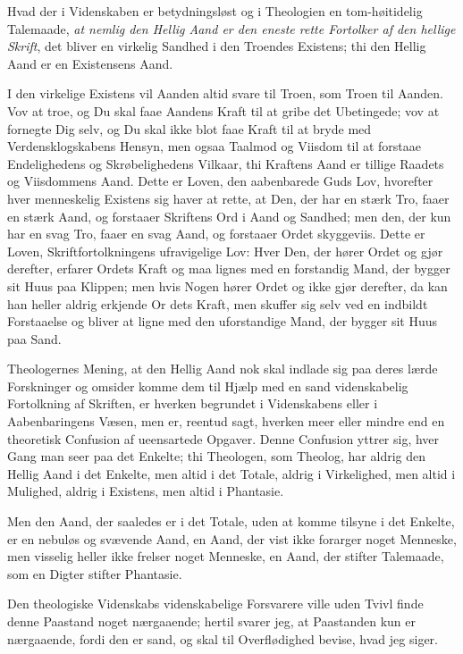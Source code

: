 \documentclass[12pt,a4paper]{book}
\newcommand{\opage}[1]{\marginnote{\footnotesize\textit{[#1]}}}
\begin{document}
Hvad der i Videnskaben er betydningsløst og i Theologien en tom-høitidelig
Talemaade, \emph{at nemlig den Hellig Aand er den eneste rette Fortolker af
den hellige Skrift}, det bliver en virkelig Sandhed i den Troendes Existens;
thi den Hellig Aand er en Existensens Aand.

I den virkelige Existens vil Aanden altid svare til Troen, som Troen til
Aanden. Vov at troe, og Du skal faae Aandens Kraft til at gribe det
Ubetingede; vov at fornegte Dig selv, og Du skal ikke blot faae Kraft til at
bryde med Verdensklogskabens Hensyn, men ogsaa Taalmod og Viisdom til at
forstaae Endelighedens og Skrøbelighedens Vilkaar, thi Kraftens Aand er
tillige Raadets og Viisdommens Aand. Dette er Loven, den aabenbarede Guds
Lov, hvorefter hver menneskelig Existens sig haver at rette, at Den, der har
en stærk Tro, faaer en stærk Aand, og forstaaer Skriftens Ord i Aand og
Sandhed; men den, der kun har en svag Tro, faaer en svag Aand, og forstaaer
Ordet skyggeviis. Dette er Loven, Skriftfortolkningens ufravigelige Lov: Hver
Den, der hører Ordet og gjør derefter, erfarer Ordets Kraft og maa lignes med
en forstandig Mand, der bygger sit Huus paa Klippen; men hvis Nogen hører
Ordet og ikke gjør derefter, da kan han heller aldrig erkjende Or\-%
\opage{78}dets Kraft, men skuffer sig selv ved en indbildt Forstaaelse og bliver at
ligne med den uforstandige Mand, der bygger sit Huus paa Sand.

Theologernes Mening, at den Hellig Aand nok skal indlade sig paa deres lærde
Forskninger og omsider komme dem til Hjælp med en sand videnskabelig
Fortolkning af Skriften, er hverken begrundet i Videnskabens eller i
Aabenbaringens Væsen, men er, reentud sagt, hverken meer eller mindre end en
theoretisk Confusion af ueensartede Opgaver. Denne Confusion yttrer sig, hver
Gang man seer paa det Enkelte; thi Theologen, som Theolog, har aldrig den
Hellig Aand i det Enkelte, men altid i det Totale, aldrig i Virkelighed, men
altid i Mulighed, aldrig i Existens, men altid i Phantasie.

Men den Aand, der saaledes er i det Totale, uden at komme tilsyne i det
Enkelte, er en nebuløs og svævende Aand, en Aand, der vist ikke forarger
noget Menneske, men visselig heller ikke frelser noget Menneske, en Aand, der
stifter Talemaade, som en Digter stifter Phantasie.

Den theologiske Videnskabs videnskabelige Forsvarere ville uden Tvivl finde
denne Paastand noget nærgaaende; hertil svarer jeg, at Paastanden kun er
nærgaaende, fordi den er sand, og skal til Overflødighed bevise, hvad jeg
siger.
\end{document}
